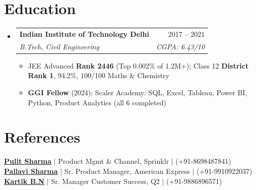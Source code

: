 \documentclass[a4paper,10pt]{article}
\makeatletter
\newcommand{\resumeItem}[1]{
  \item\small{#1\vspace{-2pt}}
}
\newcommand{\resumeSubheading}[4]{
  \vspace{-2pt}\item
  \begin{tabular*}{0.97\textwidth}[t]{l@{\extracolsep{\fill}}r}
    \textbf{#1} & #2 \\
    \textit{\small#3} & \textit{\small #4} \\
  \end{tabular*}\vspace{-7pt}
}
\newcommand{\resumeSubHeadingListStart}{\begin{itemize}[leftmargin=0.15in, label={}]}
\newcommand{\resumeSubHeadingListEnd}{\end{itemize}}
\newcommand{\resumeItemListStart}{\begin{itemize}\parfillskip=0pt}
\newcommand{\resumeItemListEnd}{\end{itemize}\vspace{-5pt}}
\makeatother
\begin{document}
\section{Education}
\resumeSubHeadingListStart
  \resumeSubheading
    {Indian Institute of Technology Delhi}{2017 -- 2021}
    {B.Tech, Civil Engineering}{CGPA: 6.43/10}
  \resumeItemListStart
    \resumeItem{JEE Advanced \textbf{Rank 2446} (Top 0.002\% of 1.2M+); Class 12 \textbf{District Rank 1}, 94.2\%, 100/100 Maths \& Chemistry}
    \resumeItem{\textbf{GGI Fellow} (2024); Scaler Academy: SQL, Excel, Tableau, Power BI, Python, Product Analytics (all 6 completed)}
  \resumeItemListEnd
\resumeSubHeadingListEnd

\section{References}
\begin{itemize}[leftmargin=0.15in, label={}]
  \small{\item{
    \href{https://linkedin.com/in/pulit-sharma-36426349}{\textbf{\underline{Pulit Sharma}}} $|$ Product Mgmt \& Channel, Sprinklr $|$ (+91-8698487841) \\
    \href{https://linkedin.com/in/pallavi-sharma-54088159}{\textbf{\underline{Pallavi Sharma}}} $|$ Sr. Product Manager, American Express $|$ (+91-9910922037) \\
    \href{https://linkedin.com/in/kartik-bn-3770807b}{\textbf{\underline{Kartik B.N}}} $|$ Sr. Manager Customer Success, Q2 $|$ (+91-9886896571)
  }}
\end{itemize}
\end{document}
